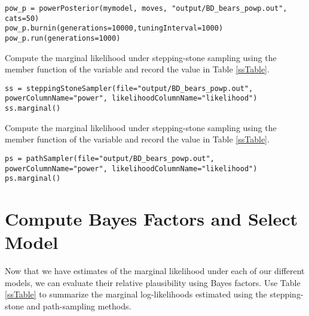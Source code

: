 {\tt \begin{snugshade*}
\begin{lstlisting}
pow_p = powerPosterior(mymodel, moves, "output/BD_bears_powp.out", cats=50) 
pow_p.burnin(generations=10000,tuningInterval=1000)
pow_p.run(generations=1000)  
\end{lstlisting}
\end{snugshade*}}

Compute the marginal likelihood under stepping-stone sampling using the member function  of the  variable and record the value in Table \ref{ssTable}.
{\tt \small \begin{snugshade*}
\begin{lstlisting}
ss = steppingStoneSampler(file="output/BD_bears_powp.out", powerColumnName="power", likelihoodColumnName="likelihood")
ss.marginal() 
\end{lstlisting}
\end{snugshade*}}

Compute the marginal likelihood under stepping-stone sampling using the member function  of the  variable and record the value in Table \ref{ssTable}.
{\tt \small \begin{snugshade*}
\begin{lstlisting}
ps = pathSampler(file="output/BD_bears_powp.out", powerColumnName="power", likelihoodColumnName="likelihood")
ps.marginal() 
\end{lstlisting}
\end{snugshade*}}



\bigskip
\section{Compute Bayes Factors and Select Model}


Now that we have estimates of the marginal likelihood under each of our different models, we can evaluate their relative plausibility using Bayes factors.
Use Table \ref{ssTable} to summarize the marginal log-likelihoods estimated using the stepping-stone and path-sampling methods.


